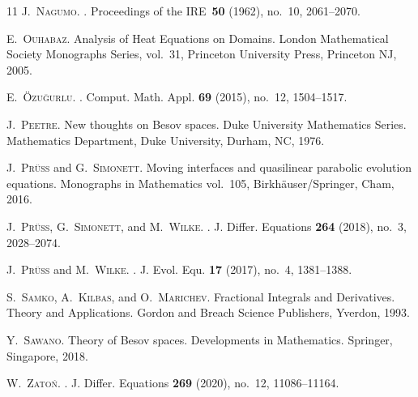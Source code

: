 \documentclass[11pt, leqno]{amsart}
\theoremstyle{definition}
\begin{document}
\begin{thebibliography}{11}
		\textsc{J.~Nagumo}.
		.
		\newblock Proceedings of the IRE~\textbf{50} (1962), no.~10, 2061--2070.



		\textsc{E.~Ouhabaz}.
		\newblock Analysis of {H}eat {E}quations on {D}omains\/.
		\newblock London Mathematical Society Monographs Series, vol.~31,
		Princeton University Press, Princeton NJ, 2005.

		\textsc{E.~{\"O}zu{\u{g}}urlu}.
		.
		\newblock Comput. Math. Appl. \textbf{69} (2015), no.~12, 1504--1517.

		\textsc{J.~Peetre}.
		\newblock New thoughts on {Besov} spaces. Duke University Mathematics Series.
		\newblock Mathematics Department, Duke University, Durham, NC, 1976.


		\textsc{J.~Pr\"uss} and \textsc{G.~Simonett}.
		\newblock Moving interfaces and quasilinear parabolic evolution equations. Monographs in Mathematics vol.~105,
		\newblock Birkh\"auser/Springer, Cham, 2016.


		\textsc{J.~Pr\"uss}, \textsc{G.~Simonett}, and \textsc{M.~Wilke}.
		.
		\newblock J. Differ. Equations \textbf{264} (2018), no.~3, 2028--2074.

		\textsc{J.~Pr\"uss} and \textsc{M.~Wilke}.
		.
		\newblock J. Evol. Equ. \textbf{17} (2017), no.~4, 1381--1388.


		\textsc{S.~Samko}, \textsc{A.~Kilbas}, and \textsc{O.~Marichev}.
		\newblock Fractional Integrals and Derivatives. Theory and Applications.
		\newblock Gordon and Breach Science Publishers, Yverdon, 1993.

		\textsc{Y.~Sawano}.
		\newblock Theory of {B}esov spaces. Developments in Mathematics.
		\newblock Springer, Singapore, 2018.


		\textsc{W.~Zato{\'n}}.
		.
		\newblock J. Differ. Equations \textbf{269} (2020), no.~12, 11086--11164.

	\end{thebibliography}
\end{document}
